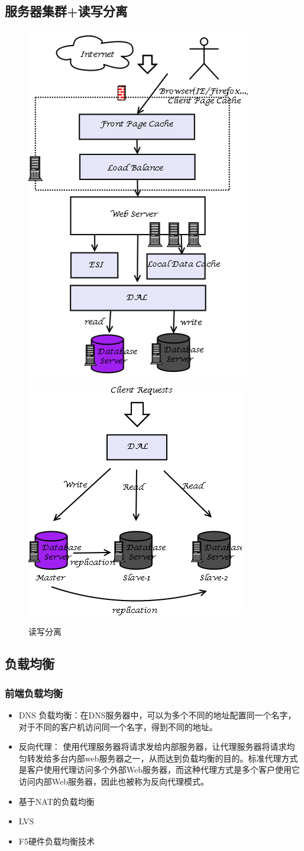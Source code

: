 \documentclass[UTF8,a4paper,8pt]{ctexbook}
\begin{document}
		\subsection{服务器集群+读写分离}
			\begin{figure}[ht]
			\centering
				\includegraphics[width=0.4\linewidth]{server-readwrite}
				\includegraphics[width=0.4\linewidth]{server-readwrite2}
				\caption{读写分离}
				\label{fig:server-readwrite}
			\end{figure}
			
		\subsection{负载均衡}
			\subsubsection{前端负载均衡}
				\begin{itemize}
					\item DNS 负载均衡：在DNS服务器中，可以为多个不同的地址配置同一个名字，对于不同的客户机访问同一个名字，得到不同的地址。
					
					\item 反向代理： 使用代理服务器将请求发给内部服务器，让代理服务器将请求均匀转发给多台内部web服务器之一，从而达到负载均衡的目的。标准代理方式是客户使用代理访问多个外部Web服务器，而这种代理方式是多个客户使用它访问内部Web服务器，因此也被称为反向代理模式。
					
					\item 基于NAT的负载均衡
					\item LVS
					\item F5硬件负载均衡技术
				\end{itemize}
\end{document}
